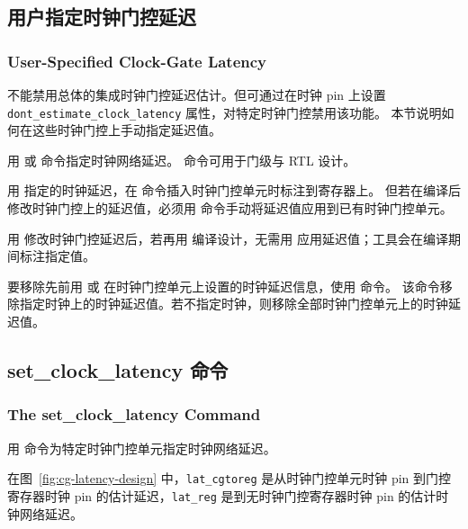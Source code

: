 \subsection{用户指定时钟门控延迟}
\subsubsection*{User-Specified Clock-Gate Latency}

不能禁用总体的集成时钟门控延迟估计。但可通过在时钟 pin 上设置 \texttt{dont\_estimate\_clock\_latency} 属性，对特定时钟门控禁用该功能。
本节说明如何在这些时钟门控上手动指定延迟值。

用  或  命令指定时钟网络延迟。
 命令可用于门级与 RTL 设计。

用  指定的时钟延迟，在  命令插入时钟门控单元时标注到寄存器上。
但若在编译后修改时钟门控上的延迟值，必须用  命令手动将延迟值应用到已有时钟门控单元。

\begin{noteBox}
用  修改时钟门控延迟后，若再用  编译设计，无需用  应用延迟值；工具会在编译期间标注指定值。
\end{noteBox}

要移除先前用  或  在时钟门控单元上设置的时钟延迟信息，使用  命令。
该命令移除指定时钟上的时钟延迟值。若不指定时钟，则移除全部时钟门控单元上的时钟延迟值。

\subsection{set\_clock\_latency 命令}
\subsubsection*{The set\_clock\_latency Command}

用  命令为特定时钟门控单元指定时钟网络延迟。

在图~\ref{fig:cg-latency-design} 中，\texttt{lat\_cgtoreg} 是从时钟门控单元时钟 pin 到门控寄存器时钟 pin 的估计延迟，\texttt{lat\_reg} 是到无时钟门控寄存器时钟 pin 的估计时钟网络延迟。


